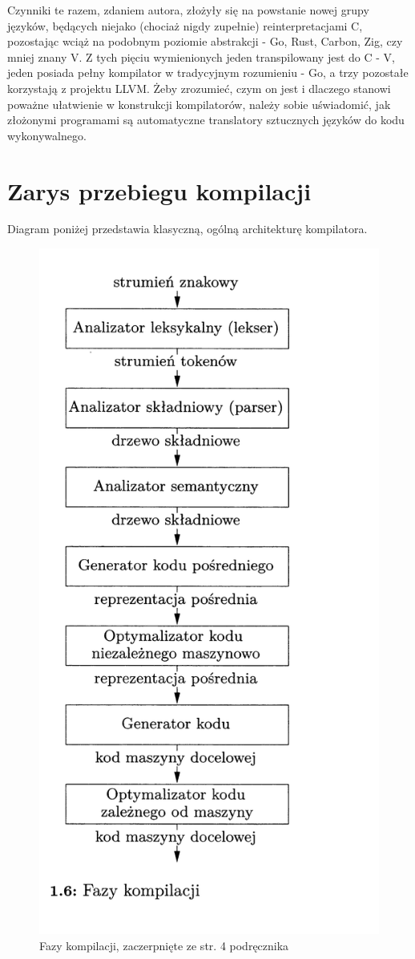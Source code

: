 Czynniki te razem, zdaniem autora, złożyły się na powstanie nowej grupy języków, będących niejako (chociaż nigdy zupełnie) reinterpretacjami C, pozostając wciąż na podobnym poziomie abstrakcji - Go, Rust, Carbon, Zig, czy mniej znany V.
Z tych pięciu wymienionych jeden transpilowany jest do C - V\cite{vlang_repo}, jeden posiada pełny kompilator w tradycyjnym rozumieniu - Go\cite{go_faq}, a trzy pozostałe korzystają z projektu LLVM\cite{rust_repo}\cite{carbon_repo}\cite{zig_repo}. Żeby zrozumieć, czym on jest i dlaczego stanowi poważne ułatwienie w konstrukcji kompilatorów, należy sobie uświadomić, jak złożonymi programami są automatyczne translatory sztucznych języków do kodu wykonywalnego. 
\clearpage

\section{Zarys przebiegu kompilacji}
Diagram poniżej przedstawia klasyczną, ogólną architekturę kompilatora.

\begin{figure}[H]
    \centering
    \includegraphics[height=0.8\linewidth]{images/wstep/fazy_kompilacji.png_bin_popr.png}
    \caption{Fazy kompilacji, zaczerpnięte ze str. 4 podręcznika\cite{DRAGON_BOOK}}
\end{figure}

 
